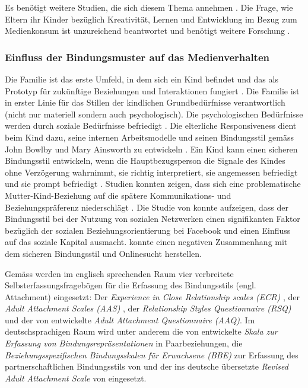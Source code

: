 Es benötigt weitere Studien, die sich diesem Thema annehmen \cite{Wartella2016}. Die Frage, wie Eltern ihr Kinder bezüglich Kreativität, Lernen und Entwicklung im Bezug zum Medienkonsum ist unzureichend beantwortet und benötigt weitere Forschung \cite{AmericanAcademyofPediatrics2011,Troseth2016}. 
\subsubsection{Einfluss der Bindungsmuster auf das Medienverhalten} 
Die Familie ist das erste Umfeld, in dem sich ein Kind befindet  und das als Prototyp für zukünftige Beziehungen und Interaktionen fungiert \cite{Floros2013}. Die Familie ist in erster Linie für das Stillen der kindlichen Grundbedürfnisse verantwortlich (nicht nur materiell sondern auch psychologisch). Die psychologischen Bedürfnisse werden durch soziale Bedürfnisse befriedigt \cite{Hazan1994}. Die elterliche Responsiveness dient beim Kind dazu, seine internen Arbeitsmodelle und seinen Bindungsstil gemäss John Bowlby und Mary Ainsworth zu entwickeln \cite{Bretherton1999}. Ein Kind kann einen sicheren Bindungsstil entwickeln, wenn die Hauptbezugsperson die Signale des Kindes ohne Verzögerung wahrnimmt, sie richtig interpretiert, sie angemessen befriedigt und sie prompt befriedigt \cite{Bell1972}. Studien konnten zeigen, dass sich eine problematische Mutter-Kind-Beziehung auf die spätere Kommunikations- und Beziehungspräferenz niederschlägt \cite{Szwedo2011}. Die Studie von  konnte aufzeigen, dass der Bindungsstil bei der Nutzung von sozialen Netzwerken einen signifikanten Faktor bezüglich der sozialen Beziehungsorientierung bei Facebook und einen Einfluss auf das soziale Kapital ausmacht.  konnte einen negativen Zusammenhang mit dem sicheren Bindungsstil und Onlinesucht herstellen.  

Gemäss  werden im englisch sprechenden Raum vier verbreitete Selbsterfassungsfragebögen für die Erfassung des Bindungsstils (engl. Attachment) eingesetzt: Der \textit{
Experience in Close Relationship scales (ECR)} \cite{Brennan1998}, der \textit{Adult Attachment Scales (AAS)} \cite{Collins1990}, der \textit{Relationship Styles Questionnaire (RSQ)} \cite{Griffin1994} und der von  entwickelte \textit{Adult Attachment Questionnaire (AAQ)}. Im deutschsprachigen Raum wird unter anderem die von  entwickelte \textit{Skala zur Erfassung von Bindungsrepräsentationen} in Paarbeziehungen, die \textit{Beziehungsspezifischen Bindungsskalen für Erwachsene (BBE)} zur Erfassung des partnerschaftlichen Bindungsstils von  und der ins deutsche übersetzte \textit{Revised Adult Attachment Scale} von  eingesetzt. 

